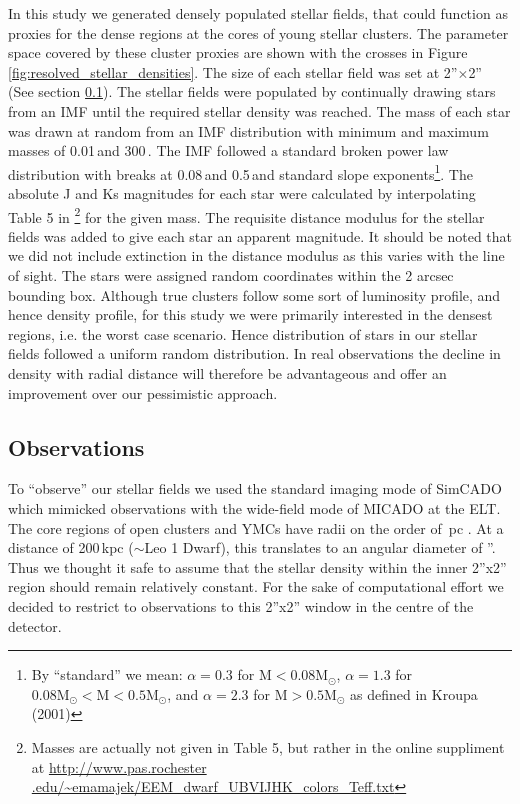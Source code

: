 In this study we generated densely populated stellar fields, that could
function  as proxies for the dense regions at the cores of young stellar
clusters. The parameter space covered by these cluster proxies are shown with
the crosses in Figure \ref{fig:resolved_stellar_densities}. The size of each
stellar field was set at 2''$\times$2'' (See section \ref{sec:telescope}).
The  stellar fields were populated by continually drawing stars from an IMF
until the required stellar density was reached. The mass of each star was
drawn  at random from an IMF distribution with minimum and maximum masses of
0.01\,\msun and 300\,\msun. The IMF followed a standard \citet{kroupa2001}
broken power law distribution with breaks at 0.08\,\msun and 0.5\,\msun and
standard slope exponents\footnote{By ``standard'' we mean: $\alpha=0.3$ for
$\mathrm{M} < 0.08 \mathrm{M}_\odot$, $\alpha=1.3$ for $0.08\mathrm{M}_\odot
< \mathrm{M}  < 0.5 \mathrm{M}_\odot$, and $\alpha=2.3$ for $\mathrm{M} > 0.5
\mathrm{M}_\odot$ as defined in Kroupa (2001)}. The absolute J and Ks
magnitudes  for each star were calculated by interpolating Table 5 in
\citet{pecaut2013}\footnote{Masses are actually not given in Table 5, but
rather in the online suppliment at  \url{http://www.pas.rochester
.edu/~emamajek/EEM_dwarf_UBVIJHK_colors_Teff.txt}} for the given mass. The
requisite distance modulus for the stellar fields was added to give each star
an apparent magnitude. It should be noted that we did not include extinction
in the distance modulus as this varies with the line of sight. The stars were
assigned random coordinates within the 2 arcsec bounding box. Although true
clusters follow some sort of luminosity profile, and hence density profile,
for  this study we were primarily interested in the densest regions, i.e. the
worst case scenario. Hence distribution of stars in our stellar fields
followed  a uniform random distribution. In real observations the decline in
density with radial distance will therefore be advantageous and offer an
improvement over our pessimistic approach.


\subsection{Observations}
\label{sec:telescope}

To ``observe'' our stellar fields we used the standard imaging mode of
SimCADO \citep{leschinski2016} which mimicked observations with the
wide-field  mode of MICADO at the ELT. The core regions of open clusters and
YMCs have radii on the order of \,pc \citep{portegies2010}. At a distance
of  200\,kpc ($\sim$Leo 1 Dwarf), this translates to an angular diameter of
''.  Thus we thought it safe to assume that the stellar density within the
inner 2''x2'' region should remain relatively constant. For the sake of
computational effort we decided to restrict to observations to this 2''x2''
window in the centre of the detector.

